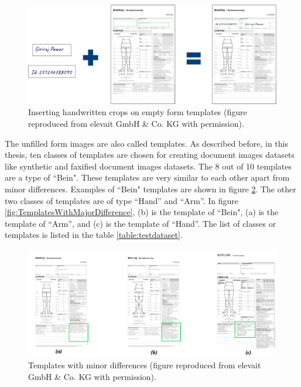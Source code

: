 \begin{figure}[H]
        \begin{center}
	    \includegraphics[scale=0.40]{images/Implementation/InsertHandwrittenCrops.png}
	    \caption[Inserting handwritten crops on empty form templates.]{Inserting handwritten crops on empty form templates (figure reproduced from elevait GmbH \& Co. KG with permission).}
	    \label{fig:InsertHandwrittenCrops}
	    \end{center}
\end{figure}



The unfilled form images are also called templates. As described before, in this thesis, ten classes of templates are chosen for creating document images datasets like synthetic and faxified document images datasets. The 8 out of 10 templates are a type of ``Bein". These templates are very similar to each other apart from minor differences. Examples of ``Bein" templates are shown in figure \ref{fig:TemplatesWithMinorDifference}. The other two classes of templates are of type ``Hand'' and ``Arm''. In figure \ref{fig:TemplatesWithMajorDifference}, (b) is the template of ``Bein", (a) is the template of ``Arm'', and (c) is the template of ``Hand''. The list of classes or templates is listed in the table \ref{table:testdataset}.

\begin{figure}[H]
        \begin{center}
	    \includegraphics[scale=0.30]{images/Implementation/TemplatesWithMinorDifference.png}
	    \caption[Templates with minor differences.]{Templates with minor differences (figure reproduced from elevait GmbH \& Co. KG with permission).}
	    \label{fig:TemplatesWithMinorDifference}
	    \end{center}
\end{figure}



